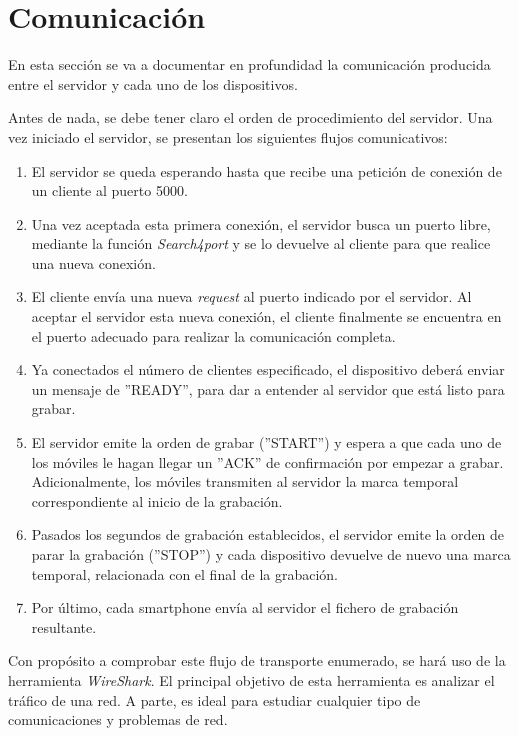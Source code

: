 \documentclass[a4paper,11pt]{book}
\begin{document}
				
				
		\section{Comunicación}
		En esta sección se va a documentar en profundidad la comunicación producida entre el servidor y cada uno de los dispositivos.
		
		Antes de nada, se debe tener claro el orden de procedimiento del servidor. Una vez iniciado el servidor, se presentan los siguientes flujos comunicativos:
		\begin{enumerate}
		\item El servidor se queda esperando hasta que recibe una petición de conexión de un cliente al puerto 5000.
		\item Una vez aceptada esta primera conexión, el servidor busca un puerto libre, mediante la función \textit{Search4port} y se lo devuelve al cliente para que realice una nueva conexión.
		\item El cliente envía una nueva \textit{request} al puerto indicado por el servidor. Al aceptar el servidor esta nueva conexión, el cliente finalmente se encuentra en el puerto adecuado para realizar la comunicación completa.
		\item Ya conectados el número de clientes especificado, el dispositivo deberá enviar un mensaje de ''READY'', para dar a entender al servidor que está listo para grabar.
		\item El servidor emite la orden de grabar (''START'') y espera a que cada uno de los móviles le hagan llegar un ''ACK'' de confirmación por empezar a grabar. Adicionalmente, los móviles transmiten al servidor la marca temporal correspondiente al inicio de la grabación.
		\item Pasados los segundos de grabación establecidos, el servidor emite la orden de parar la grabación (''STOP'') y cada dispositivo devuelve de nuevo una marca temporal, relacionada con el final de la grabación.
		\item Por último, cada smartphone envía al servidor el fichero de grabación resultante.
		\end{enumerate}
			
			Con propósito a comprobar este flujo de transporte enumerado, se hará uso de la herramienta \textit{WireShark}. El principal objetivo de esta herramienta es analizar el tráfico de una red. A parte, es ideal para estudiar cualquier tipo de comunicaciones y problemas de red.
			
\end{document}
